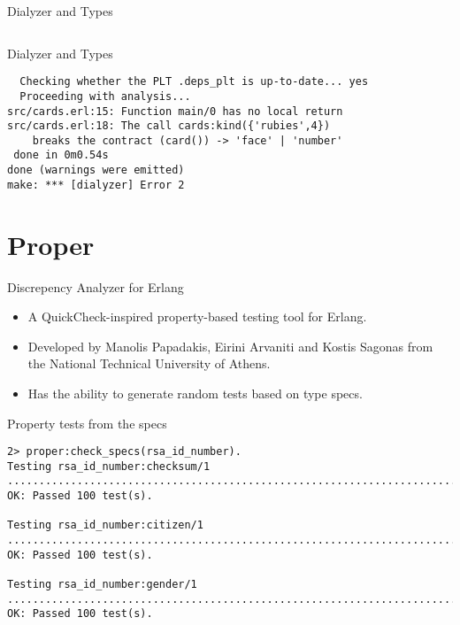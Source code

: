 \documentclass{beamer}
\begin{document}
\begin{frame}{Dialyzer and Types}

  \inputminted[firstline=11]{erlang}{src/cards.erl}

\end{frame}

\begin{frame}[fragile]{Dialyzer and Types}

  \begin{verbatim}
  Checking whether the PLT .deps_plt is up-to-date... yes
  Proceeding with analysis...
src/cards.erl:15: Function main/0 has no local return
src/cards.erl:18: The call cards:kind({'rubies',4})
    breaks the contract (card()) -> 'face' | 'number'
 done in 0m0.54s
done (warnings were emitted)
make: *** [dialyzer] Error 2
  \end{verbatim}

\end{frame}

\section{Proper}


\begin{frame}{Discrepency Analyzer for Erlang}

  \begin{itemize}[<+->]
  \item A QuickCheck-inspired property-based testing tool for Erlang.
  \item Developed by Manolis Papadakis, Eirini Arvaniti and Kostis
    Sagonas from the National Technical University of Athens.
  \item Has the ability to generate random tests based on type specs.
  \end{itemize}

\end{frame}

\begin{frame}[fragile]{Property tests from the specs}

  \begin{verbatim}
2> proper:check_specs(rsa_id_number).
Testing rsa_id_number:checksum/1
....................................................................................................
OK: Passed 100 test(s).

Testing rsa_id_number:citizen/1
....................................................................................................
OK: Passed 100 test(s).

Testing rsa_id_number:gender/1
....................................................................................................
OK: Passed 100 test(s).
  \end{verbatim}
\end{frame}
\end{document}
